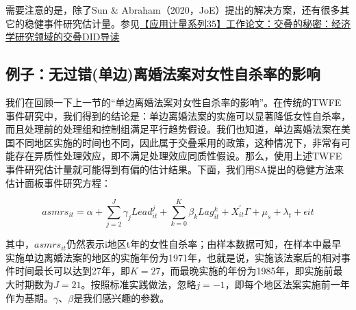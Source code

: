 \documentclass[cn,12pt,math=newtx,citestyle=gb7714-2015,bibstyle=gb7714-2015]{elegantbook}
\begin{document}
    需要注意的是，除了Sun \& Abraham（2020，JoE）提出的解决方案，还有很多其它的稳健事件研究估计量。参见\href{https://mp.weixin.qq.com/s?__biz=MzAwODY5MDA3NA==&mid=2455734924&idx=1&sn=5990e3522a6a5288134d9205c1fe163b&chksm=8cc02a79bbb7a36f2f86680b85f4fb336c7469e7b187e2c1f8bb9165729a7097164488e729a5&scene=21#wechat_redirect}{【应用计量系列35】工作论文：交叠的秘密：经济学研究领域的交叠DID导读}
	
	 \subsection*{例子：无过错(单边)离婚法案对女性自杀率的影响}
	
	我们在回顾一下上一节的“单边离婚法案对女性自杀率的影响”。在传统的TWFE事件研究中，我们得到的结论是：单边离婚法案的实施可以显著降低女性自杀率，而且处理前的处理组和控制组满足平行趋势假设。我们也知道，单边离婚法案在美国不同地区实施的时间也不同，因此属于交叠采用的政策，这种情况下，非常有可能存在异质性处理效应，即不满足处理效应同质性假设。那么，使用上述TWFE事件研究估计量就可能得到有偏的估计结果。下面，我们用SA提出的稳健方法来估计面板事件研究方程：
	
	\begin{equation}
		asmrs_{it}=\alpha+\sum_{j=2}^J \gamma_j Lead_{it}^j +\sum_{k=0}^K \beta_k Lag_{it}^k +X^{'}_{it}\Gamma+ \mu_s +\lambda_t  +\epsilon{it}
	\end{equation}
	
	其中，$asmrs_{it}$仍然表示i地区t年的女性自杀率；由样本数据可知，在样本中最早实施单边离婚法案的地区的实施年份为1971年，也就是说，实施该法案后的相对事件时间最长可以达到27年，即$K=27$，而最晚实施的年份为1985年，即实施前最大时期数为$J=21$。按照标准实践做法，忽略$j=-1$，即每个地区法案实施前一年作为基期。$\gamma、\beta$是我们感兴趣的参数。
	
\end{document}
